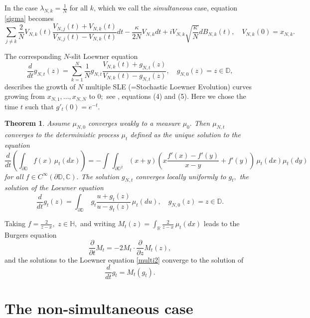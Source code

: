 \documentclass[a4paper,twoside,11pt]{article}
\theoremstyle{plain}
\newtheorem{theorem}{Theorem}[section]
\theoremstyle{definition}
\theoremstyle{remark}
\newcommand\C{\mathbb C}         %
\newcommand\R{\mathbb R}         %
\newcommand\Ha{\mathbb H}
\newcommand\D{\mathbb D}
\begin{document}
In the case $\lambda_{N,k} = \frac1{N}$ for all $k$, which we call the \emph{simultaneous} case, equation \eqref{sigma} becomes
\begin{equation}\label{sigma_simul}
 \sum_{j\not=k}\frac{2}{N} V_{N,k}(t)\frac{V_{N,j}(t)+V_{N,k}(t)}{V_{N,j}(t)-V_{N,k}(t)}dt-\frac{\kappa}{2N}V_{N,k}dt+iV_{N,k}\sqrt{\frac{\kappa}{N}}dB_{N,k}(t), \quad V_{N,k}(0)=x_{N,k}.
\end{equation}

The corresponding $N$-slit Loewner equation \begin{equation}\label{multi2}\frac{d}{dt}g_{N,t}(z) = \sum_{k=1}^N \frac1{N}  g_{N,t} \frac{V_{N,k}(t)+g_{N,t}(z)}{V_{N,k}(t)-g_{N,t}(z)}, \quad g_{N,0}(z)=z\in\D, \end{equation}
describes the growth of $N$ multiple SLE (=Stochastic Loewner Evolution) curves growing from $x_{N,1},...,x_{N,N}$ to $0;$ see \cite{MR2004294}, equations (4) and (5). Here we chose the time $t$ such that $g'_t(0)=e^{-t}.$\\

\begin{theorem}
Assume $\mu_{N,0}$ converges weakly to a measure $\mu_0.$ Then $\mu_{N,t}$ converges to the deterministic process $\mu_t$ defined as the unique solution to the equation
\begin{equation}
\label{eq:1}
\frac{d}{dt}\left(\int_{\partial\D}f(x) \,\mu_t(dx)\right) = -\int_{}\int_{\partial\D^2} (x+y)\left(x\frac{f'(x)-f'(y)}{x-y} + f'(y)\right) \,
\mu_{t}(dx) \mu_{t}(dy)
\end{equation}
for all $f\in C^\infty(\partial\D,\C).$ The solution $g_{N,t}$ converges locally uniformly to $g_t,$ the solution of the Loewner equation
\begin{equation}
\label{eq:2}
\frac{d}{dt}g_{t}(z) = \int_{\partial\D}\  g_{t} \frac{u+g_{t}(z)}{u-g_{t}(z)}\,\mu_t(du), \quad g_{N,0}(z)=z\in\D.
\end{equation}
\end{theorem}

Taking $f=\frac{2}{z-x},$ $z\in\Ha,$ and writing $M_t(z)=\int_\R \frac{2}{z-x}\,\mu_t(dx)$ leads to the Burgers equation
$$\frac{\partial}{\partial t} M_t = -2M_t\cdot \frac{\partial}{\partial z}M_t(z),$$
and the solutions to the Loewner equation \eqref{multi2} converge to the solution of 
$$ \frac{d}{dt}g_t = M_t(g_t). $$

\section{The non-simultaneous case}
\end{document}
